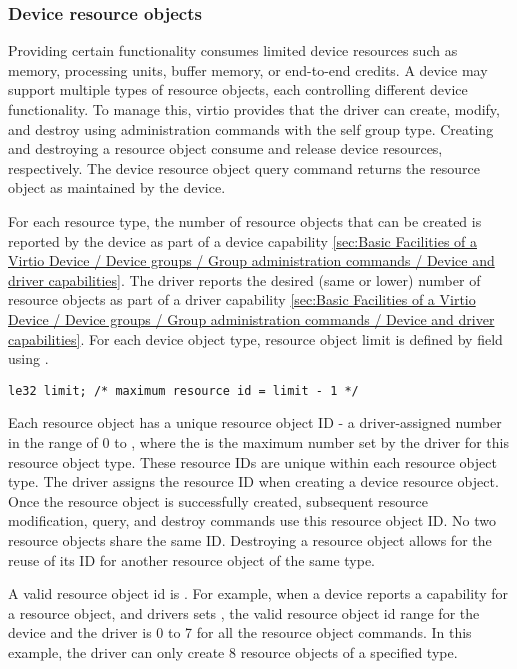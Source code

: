 \subsubsection{Device resource objects}\label{sec:Basic Facilities of a Virtio Device / Device groups / Group administration commands / Device resource objects}

Providing certain functionality consumes limited device resources such as
memory, processing units, buffer memory, or end-to-end credits. A device may
support multiple types of resource objects, each controlling different device
functionality. To manage this, virtio provides
 that the driver can create, modify, and
destroy using administration commands with the self group type. Creating and
destroying a resource object consume and release device resources, respectively.
The device resource object query command returns the resource object as
maintained by the device.

For each resource type, the number of resource objects that can be created
is reported by the device as part of a device capability
\ref{sec:Basic Facilities of a Virtio Device / Device groups / Group administration commands / Device and driver capabilities}.
The driver reports the desired (same or lower) number of resource objects
as part of a driver capability \ref{sec:Basic Facilities of a Virtio Device / Device groups / Group administration commands / Device and driver capabilities}.
For each device object type, resource object limit is defined by field
 using .

\begin{lstlisting}
le32 limit; /* maximum resource id = limit - 1 */
\end{lstlisting}

Each resource object has a unique resource object ID - a driver-assigned number
in the range of 0 to , where the  is the maximum
number set by the driver for this resource object type. These resource IDs are unique within
each resource object type. The driver assigns the resource ID when creating a
device resource object. Once the resource object is successfully created,
subsequent resource modification, query, and destroy commands use this
resource object ID. No two resource objects share the same ID. Destroying a
resource object allows for the reuse of its ID for another resource object
of the same type.

A valid resource object id is . For example, when a device
reports a  capability for a resource object, and drivers sets
, the valid resource object id range for the device and the
driver is 0 to 7 for all the resource object commands. In this example,
the driver can only create 8 resource objects of a specified type.

